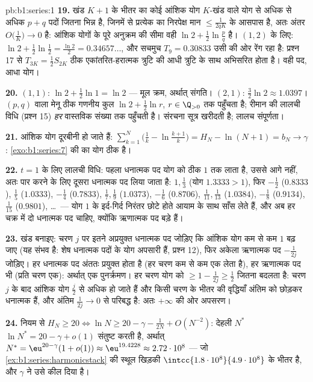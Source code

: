 \begin{solution}{pb:b1:series:1}
\textbf{19.} खंड $K + 1$ के भीतर का कोई आंशिक योग $K$-खंड वाले योग से अधिक
से अधिक $p + q$ पदों जितना भिन्न है, जिनमें से प्रत्येक का निरपेक्ष मान
$\leq \frac{1}{2qK}$ के आसपास है, अतः अंतर $O\bigl(\frac1K\bigr) \to 0$ है:
आंशिक योगों के पूरे अनुक्रम की सीमा वही $\ln 2 + \frac12\ln\frac pq$ है।
$(1, 2)$ के लिए: $\ln 2 + \frac12\ln\frac12 = \frac{\ln 2}{2} =
0.34657\dots$, और सचमुच $T_9 = 0.30833$ उसी की ओर रेंग रहा है: प्रश्न 17 से
$T_{3K} = \frac12 S_{2K}$ ठीक एकांतरित-हरात्मक त्रुटि की आधी त्रुटि के साथ
अभिसरित होता है। वही पद, आधा योग।

\textbf{20.} $(1,1)$: $\ln 2 + \frac12\ln 1 = \ln 2$ --- मूल क्रम, अर्थात्
संगति। $(2,1)$: $\frac32\ln 2 \approx 1.0397$। $(p,q)$ वाला मेनू ठीक गणनीय
 कुल $\ln 2 + \frac12\ln r$, $r \in \Q_{>0}$ तक पहुँचता है; रीमान की
लालची विधि (प्रश्न 15) \emph{हर} वास्तविक संख्या तक पहुँचती है। संरचना सूत्र
खरीदती है; लालच संपूर्णता।

\textbf{21.} आंशिक योग दूरबीनी हो जाते हैं: $\sum_{k=1}^{N} \bigl(\frac1k -
\ln\frac{k+1}{k}\bigr) = H_N - \ln(N+1) = b_N \to \gamma$:
\cref{exo:b1:series:7} की  का योग ठीक  है।

\textbf{22.} $t = 1$ के लिए लालची विधि: पहला धनात्मक पद योग को ठीक $1$ तक
लाता है, उससे आगे नहीं, अतः पार करने के लिए दूसरा धनात्मक पद लिया जाता है:
$1, \frac13$ (योग $1.3333 > 1$), फिर $-\frac12$ ($0.8333$), $\frac15$
($1.0333$), $-\frac14$ ($0.7833$), $\frac17, \frac19$ ($1.0373$), $-\frac16$
($0.8706$), $\frac1{11}, \frac1{13}$ ($1.0384$), $-\frac18$ ($0.9134$),
$\frac1{15}$ ($0.9801$), \dots\ --- योग $1$ के इर्द-गिर्द निरंतर छोटे होते
आयाम के साथ साँस लेते हैं, और अब हर चक्र में दो धनात्मक पद चाहिए, क्योंकि
ऋणात्मक पद बड़े हैं।

\textbf{23.} खंड बनाइए: चरण $j$ पर इतने अप्रयुक्त धनात्मक पद जोड़िए कि आंशिक
योग कम से कम $1$ बढ़ जाए (यह संभव है: शेष धनात्मक पदों के योग अपसारी हैं,
प्रश्न 12), फिर अकेला ऋणात्मक पद $-\frac{1} {2j}$ जोड़िए। हर धनात्मक पद
अंततः प्रयुक्त होता है (हर चरण कम से कम एक लेता है), हर ऋणात्मक पद भी (प्रति
चरण एक): अर्थात् एक पुनर्क्रमण। हर चरण योग को $\geq 1 - \frac{1}{2j} \geq
\frac12$ जितना बदलता है: चरण $j$ के बाद आंशिक योग $\frac{j}{2}$ से अधिक हो
जाते हैं और किसी चरण के भीतर की वृद्धियाँ अंतिम को छोड़कर धनात्मक हैं, और
अंतिम $\frac{1}{2j} \to 0$ से परिबद्ध है: अतः $+\infty$ की ओर अपसरण।

\textbf{24.} नियम से $H_N \geq 20 \iff \ln N \geq 20 - \gamma - \frac{1}{2N}
+ O(N^{-2})$: देहली $N^*$ $\ln N^* = 20 - \gamma + o(1)$ संतुष्ट करती है,
अर्थात् $N^* = \eu^{20 - \gamma}(1 + o(1)) \approx \eu^{19.4228} \approx
2.72\cdot10^{8}$ --- जो \cref{ex:b1:series:harmonicstack} की स्थूल खिड़की
$\intcc{1.8\cdot10^8}{4.9\cdot10^8}$ के भीतर है, और $\gamma$ ने उसे कील दिया
है।


\end{solution}
